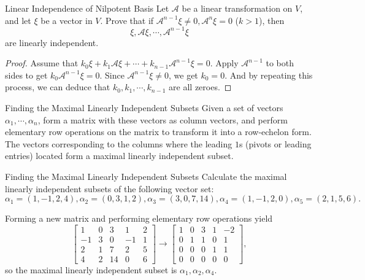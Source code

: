 \begin{example}{Linear Independence of Nilpotent Basis}{}
  Let $\mathcal{A}$ be a linear transformation on $V$,
  and let $\xi$ be a vector in $V$.
  Prove that if $\mathcal{A}^{n - 1}\xi \neq 0, \mathcal{A}^n \xi = 0$ ($k > 1$),
  then
  \begin{equation}
    \xi, \mathcal{A} \xi, \cdots, \mathcal{A}^{n-1}\xi
  \end{equation}
  are linearly independent.
\end{example}

\begin{proof}
  Assume that $k_0 \xi + k_1 \mathcal{A} \xi + \cdots +
  k_{n-1}\mathcal{A}^{n-1}\xi = 0$.
  Apply $\mathcal{A}^{n-1}$ to both sides to get $k_0 \mathcal{A}^{n-1}\xi = 0$.
  Since $\mathcal{A}^{n-1}\xi \neq 0$,
  we get $k_0 = 0$.
  And by repeating this process, we can deduce that $k_0, k_1, \cdots, k_{n-1}$
  are all zeroes.
\end{proof}

\begin{proposition}{Finding the Maximal Linearly Independent Subsets}{}
  Given a set of vectors $\alpha_1, \cdots, \alpha_n$,
  form a matrix with these vectors as column vectors,
  and perform elementary row operations on the matrix to transform it into a
  row-echelon form.
  The vectors corresponding to the columns where the leading $1$s (pivots or
  leading entries) located form a maximal linearly independent subset.
\end{proposition}

\begin{example}{Finding the Maximal Linearly Independent Subsets}{}
  Calculate the maximal linearly independent subsets of the following vector set:
  \begin{equation}
    \alpha_1 = (1, -1, 2, 4), \alpha_2 = (0, 3, 1, 2), \alpha_3 = (3, 0, 7, 14), \alpha_4 = (1, -1, 2, 0), \alpha_5 = (2, 1, 5, 6).
  \end{equation}
\end{example}

\begin{solution}
  Forming a new matrix and performing elementary row operations yield
  \begin{equation}
    \begin{bmatrix}1&0&3&1&2\\-1&3&0&-1&1\\2&1&7&2&5\\4&2&14&0&6\end{bmatrix}\to\begin{bmatrix}1&0&3&1&-2\\0&1&1&0&1\\0&0&0&1&1\\0&0&0&0&0\end{bmatrix},
  \end{equation}
  so the maximal linearly independent subset is $\alpha_1, \alpha_2, \alpha_4$.
\end{solution}

